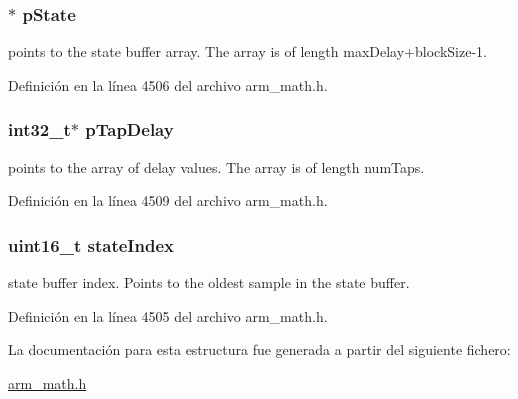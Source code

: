 \subsubsection[{\texorpdfstring{p\+State}{pState}}]{$\ast$ p\+State}\hypertarget{structarm__fir__sparse__instance__q31_adee4ba3ee8869865af7d8fa08ca913d6}{}\label{structarm__fir__sparse__instance__q31_adee4ba3ee8869865af7d8fa08ca913d6}
points to the state buffer array. The array is of length max\+Delay+block\+Size-\/1. 

Definición en la línea 4506 del archivo arm\+\_\+math.\+h.

\subsubsection[{\texorpdfstring{p\+Tap\+Delay}{pTapDelay}}]{\setlength{\rightskip}{0pt plus 5cm}int32\+\_\+t$\ast$ p\+Tap\+Delay}\hypertarget{structarm__fir__sparse__instance__q31_adec00b3793ab4f08edfeb4ea6a9eb6e6}{}\label{structarm__fir__sparse__instance__q31_adec00b3793ab4f08edfeb4ea6a9eb6e6}
points to the array of delay values. The array is of length num\+Taps. 

Definición en la línea 4509 del archivo arm\+\_\+math.\+h.

\subsubsection[{\texorpdfstring{state\+Index}{stateIndex}}]{\setlength{\rightskip}{0pt plus 5cm}uint16\+\_\+t state\+Index}\hypertarget{structarm__fir__sparse__instance__q31_a566a0cb53437e48b9a3bf18e5b03d8aa}{}\label{structarm__fir__sparse__instance__q31_a566a0cb53437e48b9a3bf18e5b03d8aa}
state buffer index. Points to the oldest sample in the state buffer. 

Definición en la línea 4505 del archivo arm\+\_\+math.\+h.



La documentación para esta estructura fue generada a partir del siguiente fichero\+:\begin{DoxyCompactItemize}
\item 
\hyperlink{arm__math_8h}{arm\+\_\+math.\+h}\end{DoxyCompactItemize}
